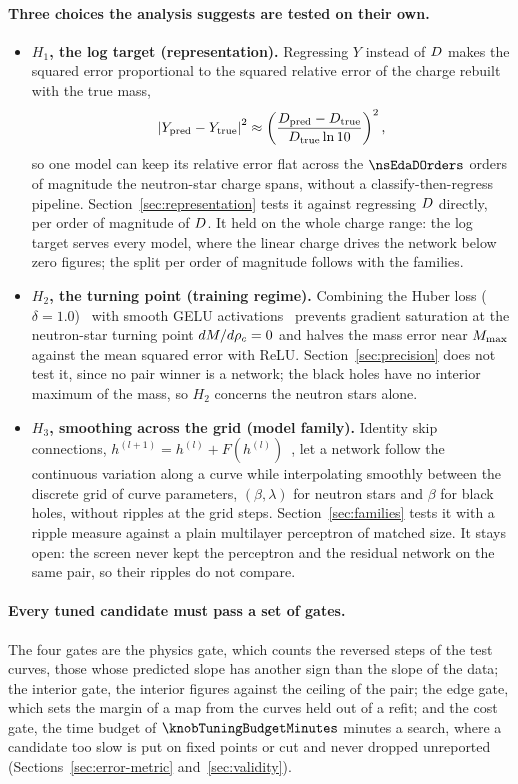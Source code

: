 \paragraph{Three choices the analysis suggests are tested on their own.}
\begin{itemize}
  \item \textbf{$H_1$, the log target (representation).} Regressing $Y$ instead of $D$ makes the squared error proportional to the squared relative error of the charge rebuilt with the true mass,
  \[
    \left| Y_{\mathrm{pred}} - Y_{\mathrm{true}} \right|^2 \approx \left( \frac{D_{\mathrm{pred}} - D_{\mathrm{true}}}{D_{\mathrm{true}} \ln 10} \right)^2 ,
  \]
  so one model can keep its relative error flat across the $\nsEdaDOrders$ orders of magnitude the neutron-star charge spans, without a classify-then-regress pipeline. Section~\ref{sec:representation} tests it against regressing $D$ directly, per order of magnitude of $D$. It held on the whole charge range: the log target serves every model, where the linear charge drives the network below zero figures; the split per order of magnitude follows with the families.
  \item \textbf{$H_2$, the turning point (training regime).} Combining the Huber loss ($\delta = 1.0$)~\citep{Huber1964} with smooth GELU activations~\citep{Hendrycks2016_GELU} prevents gradient saturation at the neutron-star turning point $dM/d\rho_c = 0$ and halves the mass error near $M_{\max}$ against the mean squared error with ReLU. Section~\ref{sec:precision} does not test it, since no pair winner is a network; the black holes have no interior maximum of the mass, so $H_2$ concerns the neutron stars alone.
  \item \textbf{$H_3$, smoothing across the grid (model family).} Identity skip connections, $h^{(l+1)} = h^{(l)} + F(h^{(l)})$~\citep{He2016_ResNet}, let a network follow the continuous variation along a curve while interpolating smoothly between the discrete grid of curve parameters, $(\beta, \lambda)$ for neutron stars and $\beta$ for black holes, without ripples at the grid steps. Section~\ref{sec:families} tests it with a ripple measure against a plain multilayer perceptron of matched size. It stays open: the screen never kept the perceptron and the residual network on the same pair, so their ripples do not compare.
\end{itemize}

\paragraph{Every tuned candidate must pass a set of gates.}
The four gates are the physics gate, which counts the reversed steps of the test curves, those whose predicted slope has another sign than the slope of the data; the interior gate, the interior figures against the ceiling of the pair; the edge gate, which sets the margin of a map from the curves held out of a refit; and the cost gate, the time budget of $\knobTuningBudgetMinutes$ minutes a search, where a candidate too slow is put on fixed points or cut and never dropped unreported (Sections~\ref{sec:error-metric} and~\ref{sec:validity}).
